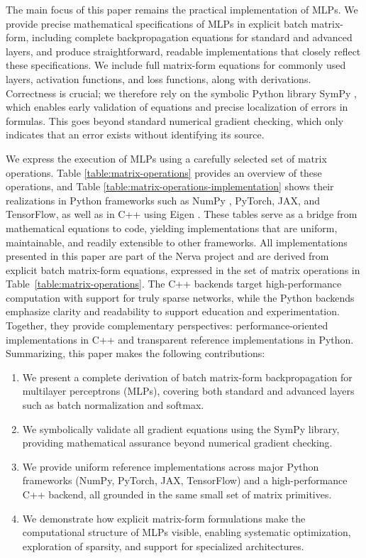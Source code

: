 \documentclass[twoside,11pt]{article}
\begin{document}
The main focus of this paper remains the practical implementation of MLPs. We provide precise mathematical specifications of MLPs in explicit batch matrix-form, including complete backpropagation equations for standard and advanced layers, and produce straightforward, readable implementations that closely reflect these specifications. We include full matrix-form equations for commonly used layers, activation functions, and loss functions, along with derivations. Correctness is crucial; we therefore rely on the symbolic Python library SymPy \citep{10.7717/peerj-cs.103}, which enables early validation of equations and precise localization of errors in formulas. This goes beyond standard numerical gradient checking, which only indicates that an error exists without identifying its source.

We express the execution of MLPs using a carefully selected set of matrix operations. Table \ref{table:matrix-operations} provides an overview of these operations, and Table \ref{table:matrix-operations-implementation} shows their realizations in Python frameworks such as NumPy \citep{harris2020array}, PyTorch, JAX, and TensorFlow, as well as in C++ using Eigen \citep{eigenweb}. These tables serve as a bridge from mathematical equations to code, yielding implementations that are uniform, maintainable, and readily extensible to other frameworks. All implementations presented in this paper are part of the Nerva project \citep{Wesselink_Nerva_library} and are derived from explicit batch matrix-form equations, expressed in the set of matrix operations in Table~\ref{table:matrix-operations}. The C++ backends target high-performance computation with support for truly sparse networks, while the Python backends emphasize clarity and readability to support education and experimentation. Together, they provide complementary perspectives: performance-oriented implementations in C++ and transparent reference implementations in Python.
Summarizing, this paper makes the following contributions:
\begin{enumerate}
    \item We present a complete derivation of batch matrix-form backpropagation for multilayer perceptrons (MLPs), covering both standard and advanced layers such as batch normalization and softmax.
    \item We symbolically validate all gradient equations using the SymPy library, providing mathematical assurance beyond numerical gradient checking.
    \item We provide uniform reference implementations across major Python frameworks (Num\-Py, PyTorch, JAX, TensorFlow) and a high-performance C++ backend, all grounded in the same small set of matrix primitives.
    \item We demonstrate how explicit matrix-form formulations make the computational structure of MLPs visible, enabling systematic optimization, exploration of sparsity, and support for specialized architectures.
\end{enumerate}
\end{document}
